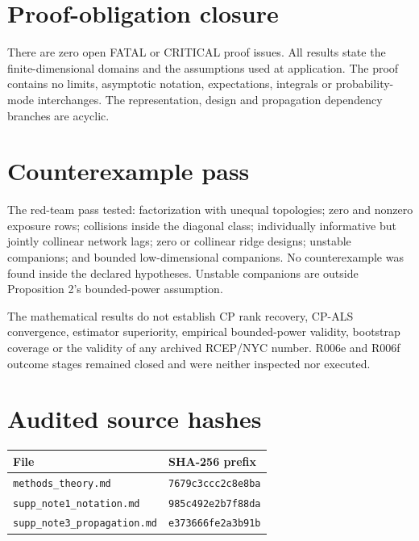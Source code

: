 \documentclass[10pt]{article}
\begin{document}
\section*{Proof-obligation closure}
There are zero open FATAL or CRITICAL proof issues. All results state the finite-dimensional domains and the assumptions used at application. The proof contains no limits, asymptotic notation, expectations, integrals or probability-mode interchanges. The representation, design and propagation dependency branches are acyclic.

\section*{Counterexample pass}
The red-team pass tested: factorization with unequal topologies; zero and nonzero exposure rows; collisions inside the diagonal class; individually informative but jointly collinear network lags; zero or collinear ridge designs; unstable companions; and bounded low-dimensional companions. No counterexample was found inside the declared hypotheses. Unstable companions are outside Proposition 2's bounded-power assumption.

\begin{scopebox}
The mathematical results do not establish CP rank recovery, CP-ALS convergence, estimator superiority, empirical bounded-power validity, bootstrap coverage or the validity of any archived RCEP/NYC number. R006e and R006f outcome stages remained closed and were neither inspected nor executed.
\end{scopebox}

\section*{Audited source hashes}
\small
\begin{tabularx}{\textwidth}{@{}Xl@{}}
\toprule
File & SHA-256 prefix \\
\midrule
\texttt{methods\_theory.md} & \texttt{7679c3ccc2c8e8ba} \\
\texttt{supp\_note1\_notation.md} & \texttt{985c492e2b7f88da} \\
\texttt{supp\_note3\_propagation.md} & \texttt{e373666fe2a3b91b} \\
\bottomrule
\end{tabularx}
\end{document}
